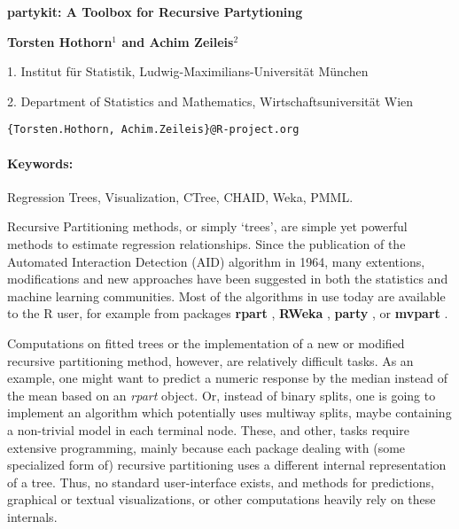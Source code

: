 \documentclass[10pt]{article}
\renewcommand{\title}[1]{\begin{center}{\bf \LARGE #1}\end{center}}
\newcommand{\keywords}{\paragraph{Keywords:}}
\begin{document}
\pagestyle{empty}

\title{\textbf{partykit}: A Toolbox for Recursive Partytioning}

\begin{center}
  {\bf Torsten Hothorn$^{1}$ and Achim Zeileis$^{2}$}
\end{center}

\begin{affiliations}
1. Institut f\"ur Statistik, Ludwig-Maximilians-Universit\"at M\"unchen \par
2. Department of Statistics and Mathematics, Wirtschaftsuniversit\"at Wien \par
\texttt{\{Torsten.Hothorn, Achim.Zeileis\}@R-project.org}
\end{affiliations}

\keywords Regression Trees, Visualization, CTree, CHAID, Weka, PMML.

\vskip 0.8cm

Recursive Partitioning methods, or simply `trees', are simple yet powerful
methods to estimate regression relationships. Since the publication of the
Automated Interaction Detection (AID) algorithm in 1964, many extentions,
modifications and new approaches have been suggested in both the statistics
and machine learning communities. Most of the algorithms in use today are
available to the \textsf{R} user, for example from packages \textbf{rpart}
\citep{PKG:rpart},
\textbf{RWeka} \citep{PKG:RWeka}, \textbf{party} \citep{PKG:party}, or \textbf{mvpart}
\citep{PKG:mvpart}.

Computations on fitted trees or the implementation of a new or modified
recursive partitioning method, however, are relatively difficult tasks.
As an example, one might want to predict a numeric response by the median
instead of the mean based on an \textit{rpart} object. Or, instead of
binary splits, one is going to implement an algorithm which potentially
uses multiway splits, maybe containing a non-trivial model in each terminal
node. These, and other, tasks require extensive programming,
mainly because each package dealing with (some specialized form of)
recursive partitioning uses a different internal representation of a tree. Thus, no
standard user-interface exists, and methods for predictions, graphical or textual
visualizations, or other computations heavily rely on these internals.
\end{document}

